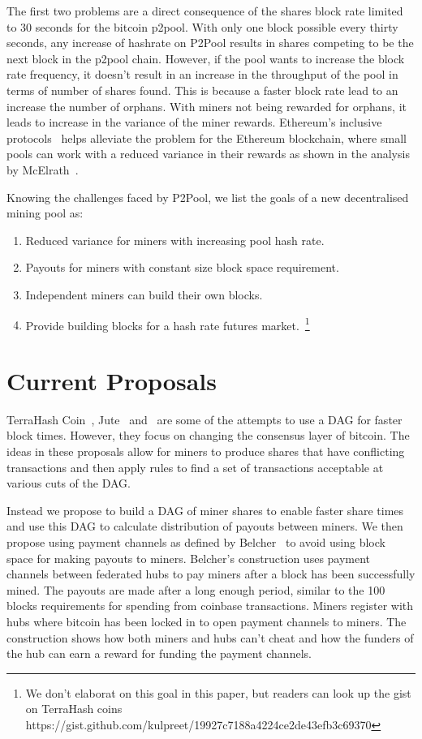 \documentclass{article}
\begin{document}
The first two problems are a direct consequence of the shares block
rate limited to 30 seconds for the bitcoin p2pool. With only one block
possible every thirty seconds, any increase of hashrate on P2Pool
results in shares competing to be the next block in the p2pool
chain. However, if the pool wants to increase the block rate
frequency, it doesn't result in an increase in the throughput of the
pool in terms of number of shares found. This is because a faster
block rate lead to an increase the number of orphans. With miners not
being rewarded for orphans, it leads to increase in the variance of
the miner rewards. Ethereum's inclusive
protocols~\cite{inclusive-protocols} helps alleviate the problem for
the Ethereum blockchain, where small pools can work with a reduced
variance in their rewards as shown in the analysis by
McElrath~\cite{mcelrath:variance}.

Knowing the challenges faced by P2Pool, we list the goals of a new
decentralised mining pool as:

\begin{enumerate}
\item Reduced variance for miners with increasing pool hash rate.
\item Payouts for miners with constant size block space requirement.
\item Independent miners can build their own blocks.
\item Provide building blocks for a hash rate futures
  market.~\footnote{We don't elaborat on this goal in this paper, but
    readers can look up the gist on TerraHash coins
    https://gist.github.com/kulpreet/19927c7188a4224ce2de43efb3c69370}
\end{enumerate}

\section{Current Proposals}

TerraHash Coin~\cite{mcelrath:variance}, Jute~\cite{jute}
and~\cite{spectre} are some of the attempts to use a DAG for faster
block times. However, they focus on changing the consensus layer of
bitcoin. The ideas in these proposals allow for miners to produce
shares that have conflicting transactions and then apply rules to find
a set of transactions acceptable at various cuts of the DAG.\@

Instead we propose to build a DAG of miner shares to enable faster
share times and use this DAG to calculate distribution of payouts
between miners. We then propose using payment channels as defined by
Belcher~\cite{channels-for-rewards} to avoid using block space for
making payouts to miners. Belcher's construction uses payment channels
between federated hubs to pay miners after a block has been
successfully mined. The payouts are made after a long enough period,
similar to the 100 blocks requirements for spending from coinbase
transactions. Miners register with hubs where bitcoin has been locked
in to open payment channels to miners. The construction shows how both
miners and hubs can't cheat and how the funders of the hub can earn a
reward for funding the payment channels.
\end{document}
